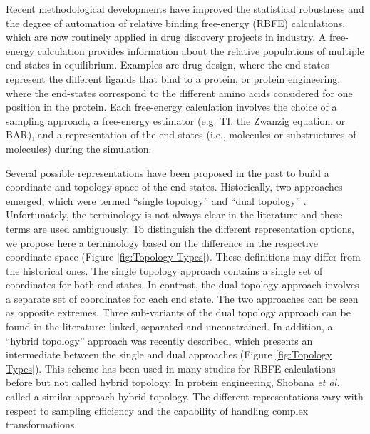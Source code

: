 Recent methodological developments have improved the statistical robustness and the degree of automation of relative binding free-energy (RBFE) calculations, which are now routinely applied in drug discovery projects in industry. 
\cite{Cournia2017,Cournia2020, Meier2021, Armacost2020, Barros2022,  Heinzelmann2021, Gapsys2020, Jespers2019, Raman2020, Christ2014, Gao2018, Tielker2021, Loeffler2018}
%
A free-energy calculation provides information about the relative populations of multiple end-states in equilibrium. Examples are drug design, where the end-states represent the different ligands that bind to a protein, \cite{Christ2009, Riniker2011, Wang2015, Wang2017, Aldeghi2016, Sidler2016,Yu2017, Jespers2019,Jiang2019, Paulsen2020} or protein engineering, where the end-states correspond to the different amino acids considered for one position in the protein.\cite{Shobana2000, Bieler2015B, Jespers2019B}
Each free-energy calculation involves the choice of a sampling approach, a free-energy estimator (e.g. TI,\cite{Kirkwood1935} the Zwanzig equation,\cite{Zwanzig1954} or BAR\cite{Bennett1976}), and a representation of the end-states (i.e., molecules or substructures of molecules) during the simulation.

Several possible representations have been proposed in the past to build a coordinate and topology space of the end-states. 
Historically, two approaches emerged, which were termed ``single topology'' \cite{Pearlman1991, Pearlman1994} and ``dual topology'' \cite{Pearlman1991, Gao1989}.
Unfortunately, the terminology is not always clear in the literature and these terms are used ambiguously.\cite{Boresch1999, Rocklin2013, Fleck2021}
To distinguish the different representation options, we propose here a terminology based on the difference in the respective coordinate space (Figure \ref{fig:Topology Types}). These definitions may differ from the historical ones. The single topology approach contains a single set of coordinates for both end states. In contrast,  the dual topology approach involves a separate set of coordinates for each end state. The two approaches can be seen as opposite extremes. Three sub-variants of the dual topology approach can be found in the literature: linked, separated and unconstrained.
In addition, a ``hybrid topology'' approach was recently described,\cite{Jiang2019} which presents an intermediate between the single and dual approaches (Figure \ref{fig:Topology Types}). This scheme has been used in many studies for RBFE calculations before but not called hybrid topology. In protein engineering, Shobana \textit{et al.} \cite{Shobana2000} called a similar approach hybrid topology.\cite{Shobana2000} The different representations vary with respect to sampling efficiency and the capability of handling complex transformations.

